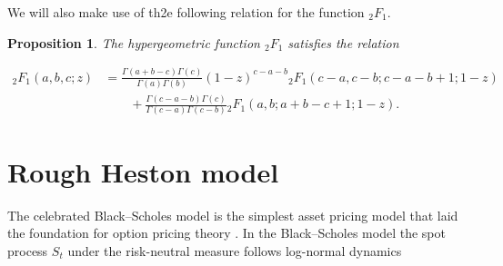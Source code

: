 \documentclass[12pt,twoside]{article}
\theoremstyle{plain}
\theoremstyle{plain}
\newtheorem{proposition}{Proposition}[section]
\theoremstyle{definition}
\theoremstyle{remark}
\numberwithin{equation}{section}
\begin{document}
We will also make use of th2e following relation for the function $_2F_1$.

\begin{proposition}

The hypergeometric function $_2F_1$ satisfies the relation

\begin{equation}
\label{eq: hypergeometric relation}
\begin{aligned}
_2F_1(a,b,c;z) &= \frac{\Gamma(a+b-c) \Gamma(c)}{\Gamma(a) \Gamma(b)}(1-z)^{c-a-b}{_{2} F_{1}}(c-a, c-b ; c-a-b+1 ; 1-z) \\[10pt]
&\qquad +\frac{\Gamma(c-a-b) \Gamma(c)}{\Gamma(c-a) \Gamma(c-b)} {_2 F_{1}}(a, b ; a+b-c+1 ; 1-z).
\end{aligned}
\end{equation}
\end{proposition}






\section{Rough Heston model}
\label{sec: rough heston model}

The celebrated Black–Scholes model is the simplest asset pricing model that laid the foundation for option pricing theory \cite{BS73}. In the Black–Scholes model the spot process $S_t$ under the risk-neutral measure follows log-normal dynamics
\end{document}
